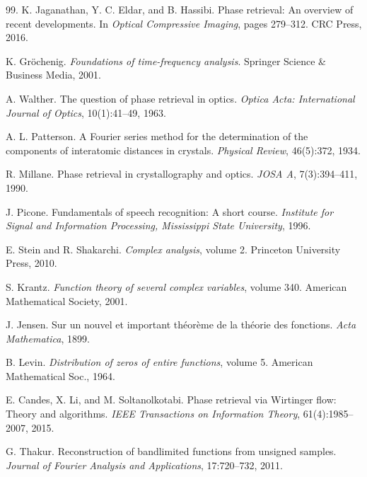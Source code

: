 \documentclass[graybox]{svmult}
\begin{document}
\begin{thebibliography}{99.}
K. Jaganathan, Y. C. Eldar, and B. Hassibi.
\newblock Phase retrieval: An overview of recent developments.
\newblock In \emph{Optical Compressive Imaging}, pages 279--312. CRC Press, 2016.

K. Gr{\"o}chenig.
\newblock \emph{Foundations of time-frequency analysis}.
\newblock Springer Science \& Business Media, 2001.


A. Walther.
\newblock The question of phase retrieval in optics.
\newblock \emph{Optica Acta: International Journal of Optics}, 10(1):41--49, 1963.

A. L. Patterson.
\newblock A {F}ourier series method for the determination of the components of
  interatomic distances in crystals.
\newblock \emph{Physical Review}, 46(5):372, 1934.

R. Millane.
\newblock Phase retrieval in crystallography and optics.
\newblock \emph{JOSA A}, 7(3):394--411, 1990.

J. Picone.
\newblock Fundamentals of speech recognition: A short course.
\newblock \emph{Institute for Signal and Information Processing, Mississippi State
  University}, 1996.


E. Stein and R. Shakarchi.
\newblock \emph{Complex analysis}, volume 2.
\newblock Princeton University Press, 2010.

S. Krantz.
\newblock \emph{Function theory of several complex variables}, volume 340.
\newblock American Mathematical Society, 2001.



J. Jensen.
\newblock Sur un nouvel et important th{\'e}or{\`e}me de la th{\'e}orie des
  fonctions.
\newblock \emph{Acta Mathematica}, 1899.

B. Levin.
\newblock \emph{Distribution of zeros of entire functions}, volume 5.
\newblock American Mathematical Soc., 1964.

E. Candes, X. Li, and M. Soltanolkotabi.
\newblock Phase retrieval via {W}irtinger flow: Theory and algorithms.
\newblock \emph{IEEE Transactions on Information Theory}, 61(4):1985--2007,
  2015.

G. Thakur.
\newblock Reconstruction of bandlimited functions from unsigned samples.
\newblock \emph{Journal of Fourier Analysis and Applications}, 17:720--732, 2011.


\end{thebibliography}
\end{document}
